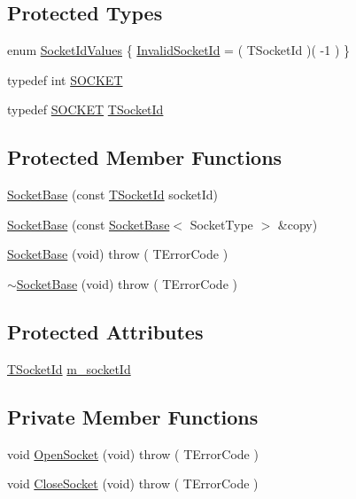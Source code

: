 \subsection*{Protected Types}
\begin{DoxyCompactItemize}
\item 
enum \hyperlink{class_socket_base_a1441f12307a40913930ccbb8baf953bb}{Socket\-Id\-Values} \{ \hyperlink{class_socket_base_a1441f12307a40913930ccbb8baf953bbaa1aa134affcd450ff233364a61bcd5b0}{Invalid\-Socket\-Id} = ( T\-Socket\-Id )( -\/1 )
 \}
\item 
typedef int \hyperlink{class_socket_base_aa1bd9ff0bcf59292806575e0abbe3829}{S\-O\-C\-K\-E\-T}
\item 
typedef \hyperlink{class_socket_base_aa1bd9ff0bcf59292806575e0abbe3829}{S\-O\-C\-K\-E\-T} \hyperlink{class_socket_base_aad53265037e46768af4d6a0c2ebed277}{T\-Socket\-Id}
\end{DoxyCompactItemize}
\subsection*{Protected Member Functions}
\begin{DoxyCompactItemize}
\item 
\hyperlink{class_socket_base_afdeb4c469db205b8030ff65540adbbc8}{Socket\-Base} (const \hyperlink{class_socket_base_aad53265037e46768af4d6a0c2ebed277}{T\-Socket\-Id} socket\-Id)
\item 
\hyperlink{class_socket_base_aae440e9ad170eeec2465c4501e91b761}{Socket\-Base} (const \hyperlink{class_socket_base}{Socket\-Base}$<$ Socket\-Type $>$ \&copy)
\item 
\hyperlink{class_socket_base_ab53eb639e056af7269e0d720736f48e2}{Socket\-Base} (void)  throw ( T\-Error\-Code )
\item 
\hyperlink{class_socket_base_aa19d43bd8b53e91b1600c7b60f8f48e0}{$\sim$\-Socket\-Base} (void)  throw ( T\-Error\-Code )
\end{DoxyCompactItemize}
\subsection*{Protected Attributes}
\begin{DoxyCompactItemize}
\item 
\hyperlink{class_socket_base_aad53265037e46768af4d6a0c2ebed277}{T\-Socket\-Id} \hyperlink{class_socket_base_aa9d855a8843ac61555721dfbedbad5a8}{m\-\_\-socket\-Id}
\end{DoxyCompactItemize}
\subsection*{Private Member Functions}
\begin{DoxyCompactItemize}
\item 
void \hyperlink{class_socket_base_a812f91e92f493eeb546395b41c5ad465}{Open\-Socket} (void)  throw ( T\-Error\-Code )
\item 
void \hyperlink{class_socket_base_accdcf166761d3a7f7dc9bfb4afd939e1}{Close\-Socket} (void)  throw ( T\-Error\-Code )
\end{DoxyCompactItemize}


